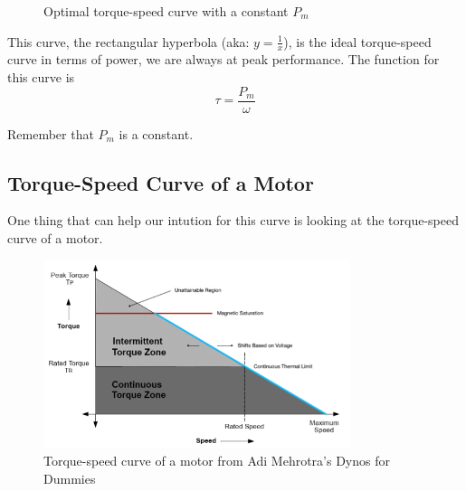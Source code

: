 \documentclass[12pt]{article}
\begin{document}
\begin{figure}[H]
  \centering
    \caption{Optimal torque-speed curve with a constant $P_{m}$}\label{fig:optimal_power_curve}
\end{figure}

This curve, the rectangular hyperbola (aka: $y=\frac{1}{x}$), is the ideal torque-speed curve in terms of power, we are always at peak performance. The function for this curve is 
\begin{equation}
  \tau = \frac{P_{m}}{\omega}
\end{equation}

Remember that $P_{m}$ is a constant.

\subsection{Torque-Speed Curve of a Motor}

One thing that can help our intution for this curve is looking at the torque-speed curve of a motor.

\begin{figure}[H]
  \centering
  \includegraphics[width=0.8\textwidth]{motor-torque-speed.png}
  \caption{Torque-speed curve of a motor from Adi Mehrotra's Dynos for Dummies}\label{fig:dynos_for_dummies}
\end{figure}
\end{document}
